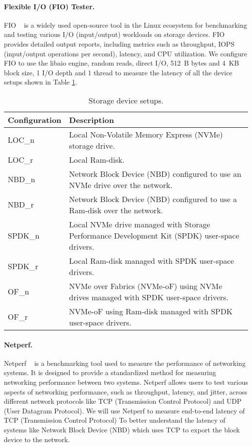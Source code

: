 \paragraph{Flexible I/O (FIO) Tester.}
FIO ~\cite{fio} is a widely used open-source tool in the Linux ecosystem for benchmarking
and testing various I/O (input/output) workloads on storage devices. FIO
provides detailed output reports, including metrics such as throughput, IOPS
(input/output operations per second), latency, and CPU utilization. We configure FIO to use the
libaio engine, random reads, direct I/O, \SI{512}{B} bytes and \SI{4}{KB} block size, 1 I/O
depth and 1 thread to measure the latency of all the device setups shown in Table
\ref{tab:storage_configurations}. 

\begin{table}[h!]
\centering
\begin{tabular}{|>{\centering\arraybackslash}m{3cm}|>{\RaggedRight\arraybackslash}m{5cm}|}
\hline
\textbf{Configuration} & \textbf{Description} \\
\hline
LOC\_n & Local Non-Volatile Memory Express (NVMe) storage drive. \\
\hline
LOC\_r & Local Ram-disk. \\
\hline
NBD\_n & Network Block Device (NBD) configured to use an NVMe drive over the network. \\
\hline
NBD\_r & Network Block Device (NBD) configured to use a Ram-disk over the network. \\
\hline
SPDK\_n & Local NVMe drive managed with Storage Performance Development Kit (SPDK) user-space drivers. \\
\hline
SPDK\_r & Local Ram-disk managed with SPDK user-space drivers. \\
\hline
OF\_n & NVMe over Fabrics (NVMe-oF) using NVMe drives managed with SPDK user-space drivers. \\
\hline
OF\_r & NVMe-oF using Ram-disk managed with SPDK user-space drivers. \\
\hline
\end{tabular}
\caption{Storage device setups.}
\label{tab:storage_configurations}
\end{table}





\paragraph{Netperf.} 
Netperf ~\cite{netperf} is a benchmarking tool used to measure the performance of networking
systems. It is designed to provide a standardized method for measuring networking
performance between two systems. Netperf allows users to test various aspects of
networking performance, such as throughput, latency, and jitter, across
different network protocols like TCP (Transmission Control Protocol) and UDP
(User Datagram Protocol). We will use Netperf to measure end-to-end latency of
TCP (Transmission Control Protocol) To better understand the latency of systems
like Network Block Device (NBD) which uses TCP to export the block device to the
network.


